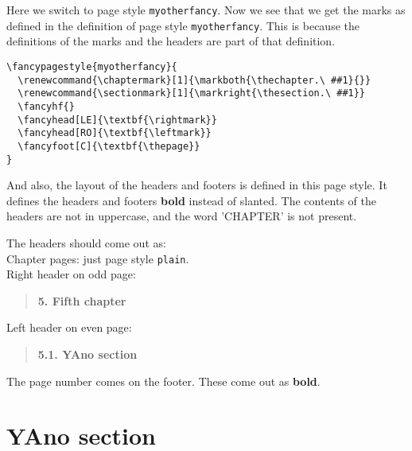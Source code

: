 \documentclass[openany]{book}
\renewcommand{\chaptermark}[1]{\markboth{\thechapter.\ #1}{}}
\renewcommand{\sectionmark}[1]{\markright{\thesection.\ #1}}
\renewcommand{\chaptermark}[1]{\markboth{\thechapter.\ ##1}{}}
\renewcommand{\sectionmark}[1]{\markright{\thesection.\ ##1}}
\renewcommand{\chaptermark}[1]{\markboth{\thechapter.\ ##1}{}}
\renewcommand{\sectionmark}[1]{\markright{\thesection.\ ##1}}
\begin{document}
\noindent
\begin{boxedminipage}{\textwidth}
Here we switch to page style \texttt{myotherfancy}.
Now we see that we get the marks as defined in the definition of page style \texttt{myotherfancy}.
This is because the definitions of the marks and the headers are  part of that definition.
\begin{verbatim}
\fancypagestyle{myotherfancy}{
  \renewcommand{\chaptermark}[1]{\markboth{\thechapter.\ ##1}{}}
  \renewcommand{\sectionmark}[1]{\markright{\thesection.\ ##1}}
  \fancyhf{}
  \fancyhead[LE]{\textbf{\rightmark}}
  \fancyhead[RO]{\textbf{\leftmark}}
  \fancyfoot[C]{\textbf{\thepage}}
}
\end{verbatim}

And also, the layout of the headers and footers is  defined in this page style. It defines the headers and footers \textbf{bold} instead of slanted.
The contents of the headers are not in uppercase, and the word 'CHAPTER' is not present.

The headers should come out as:
\\
Chapter pages: just page style \texttt{plain}.
\\
Right header on odd page:
\begin{quote}
  \textbf{5. Fifth chapter}
\end{quote}
Left header on even page:
\begin{quote}
  \textbf{5.1. YAno section}
\end{quote}
The page number comes on the footer.
These come out as \textbf{bold}.
\end{boxedminipage}
\bigskip

\lipsum[1]

\section{YAno section}

\lipsum
\end{document}
